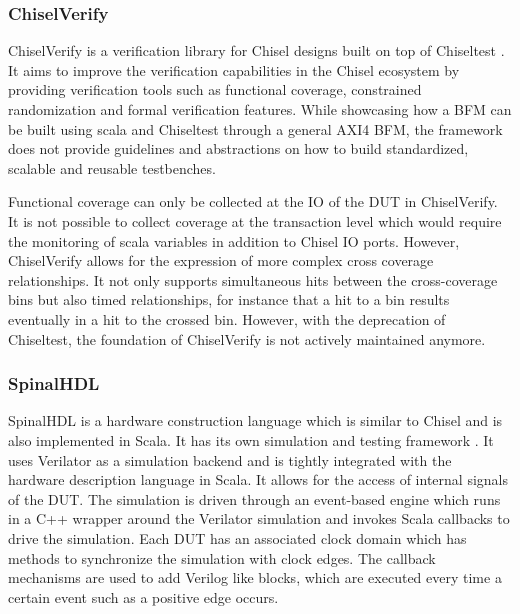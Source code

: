 \subsubsection{ChiselVerify} %

ChiselVerify is a verification library for Chisel designs built on top of Chiseltest \cite{chiselverify}. It aims to
improve the verification capabilities in the Chisel ecosystem by providing verification tools such as functional
coverage, constrained randomization and formal verification features. While showcasing how a BFM can be built using
scala and Chiseltest through a general AXI4 BFM, the framework does not provide guidelines and abstractions on how to build standardized, scalable and reusable testbenches.

Functional coverage can only be collected at the IO of the DUT in ChiselVerify. It is not possible to collect
coverage at the transaction level which would require the monitoring of scala variables in addition to Chisel IO
ports. However, ChiselVerify allows for the expression of more complex cross coverage relationships. It not only
supports simultaneous hits between the cross-coverage bins but also timed relationships, for instance that a hit to a bin results eventually in a hit to the crossed bin. However, with the deprecation of Chiseltest, the foundation of ChiselVerify is not actively maintained anymore.

\subsubsection{SpinalHDL}

SpinalHDL is a hardware construction language which is similar to Chisel and is also implemented in Scala. It has its own simulation and testing framework \cite{spinal}. It uses Verilator as a simulation backend and is tightly integrated with the hardware description language in Scala. It allows for the access of internal signals of the DUT. The simulation is driven through an event-based engine which runs in a C++ wrapper around the Verilator simulation and invokes Scala callbacks to drive the simulation. Each DUT has an associated clock domain which has methods to synchronize the simulation with clock edges. The callback mechanisms are used to add Verilog  like blocks, which are executed every time a certain event such as a positive edge occurs.

